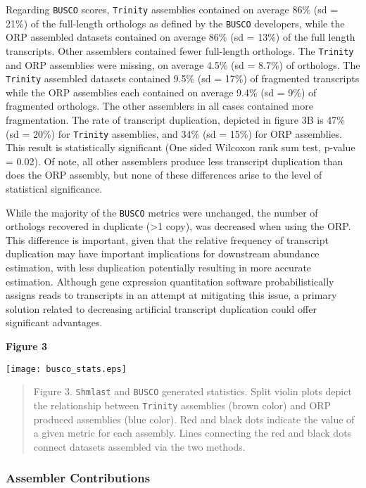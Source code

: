 \documentclass[10pt,letterpaper]{article}
\begin{document}
Regarding \texttt{BUSCO} scores, \texttt{Trinity} assemblies contained on average 86\% (sd = 21\%) of the full-length orthologs as defined by the \texttt{BUSCO} developers, while the ORP assembled datasets contained on average 86\% (sd = 13\%) of the full length transcripts. Other assemblers contained fewer full-length orthologs. The \texttt{Trinity} and ORP assemblies were missing, on average 4.5\% (sd = 8.7\%) of orthologs. The \texttt{Trinity} assembled datasets contained 9.5\% (sd = 17\%) of fragmented transcripts while the ORP assemblies each contained on average 9.4\% (sd = 9\%) of fragmented orthologs. The other assemblers in all cases contained more fragmentation. The rate of transcript duplication, depicted in figure 3B is 47\% (sd = 20\%) for \texttt{Trinity} assemblies, and 34\% (sd = 15\%) for ORP assemblies.  This result is statistically significant (One sided Wilcoxon rank sum test, p-value = 0.02). Of note, all other assemblers produce less transcript duplication than does the ORP assembly, but none of these differences arise to the level of statistical significance. 

While the majority of the \texttt{BUSCO} metrics were unchanged, the number of orthologs recovered in duplicate (\textgreater 1 copy), was decreased when using the ORP. This difference is important, given that the relative frequency of transcript duplication may have important implications for downstream abundance estimation, with less  duplication potentially resulting in more accurate estimation. Although gene expression quantitation software \citep{Patro:2017iv,Bray:2016ee} probabilistically assigns reads to transcripts in an attempt at mitigating this issue, a primary solution related to decreasing artificial transcript duplication could offer significant advantages.

\newpage
\textbf{\hypertarget{Figure 3}{Figure 3}} \\
\centerline{\texttt{[image: busco\_stats.eps]}}
\begin{quote}
\small{Figure 3. \texttt{Shmlast} and \texttt{BUSCO} generated statistics. Split violin plots depict the relationship between \texttt{Trinity} assemblies (brown color) and ORP produced assemblies (blue color). Red and black dots indicate the value of a given metric for each assembly. Lines connecting the red and black dots connect datasets assembled via the two methods.}
\end{quote} 

\subsubsection{Assembler Contributions}
\end{document}

